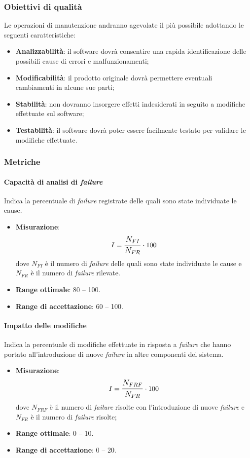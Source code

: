 \subsubsection{Obiettivi di qualità}
Le operazioni di manutenzione andranno agevolate il più possibile adottando le seguenti caratteristiche:
\begin{itemize}
\item \textbf{Analizzabilità}: il software dovrà consentire una rapida identificazione delle possibili cause di errori e malfunzionamenti;
\item \textbf{Modificabilità}: il prodotto originale dovrà permettere eventuali cambiamenti in alcune sue parti;
\item \textbf{Stabilità}: non dovranno insorgere effetti indesiderati in seguito a modifiche effettuate sul software;
\item \textbf{Testabilità}: il software dovrà poter essere facilmente testato per validare le modifiche effettuate.
\end{itemize}

\subsubsection{Metriche}
\paragraph{Capacità di analisi di \textit{failure}}
Indica la percentuale di \textit{failure} registrate delle quali sono state individuate le cause.
\begin{itemize}
	\item \textbf{Misurazione}: 
		$$I=\mathlarger{\frac{N_{FI}}{N_{FR}}} \cdot 100$$
	dove $N_{FI}$ è il numero di \textit{failure} delle quali sono state individuate le cause e $N_{FR}$ è il numero di \textit{failure} rilevate.
	\item \textbf{Range ottimale}: 80 -- 100.
	\item \textbf{Range di accettazione}: 60 -- 100.
\end{itemize}

\paragraph{Impatto delle modifiche}
Indica la percentuale di modifiche effettuate in risposta a \textit{failure} che hanno portato all'introduzione di nuove \textit{failure} in altre componenti del sistema.
\begin{itemize}
	\item \textbf{Misurazione}: 
		$$I=\mathlarger{\frac{N_{FRF}}{N_{FR}}} \cdot 100$$
	dove $N_{FRF}$ è il numero di \textit{failure} risolte con l'introduzione di nuove \textit{failure} e $N_{FR}$ è il numero di \textit{failure} risolte;
	\item \textbf{Range ottimale}: 0 -- 10.
	\item \textbf{Range di accettazione}: 0 -- 20.
\end{itemize}

\newpage